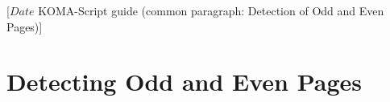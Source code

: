 %
%
%
%
%
%
%
%
% 
%
%
%
%

                 [$Date$
                  KOMA-Script guide (common paragraph: Detection of Odd and
                                     Even Pages)]


\section{Detecting Odd and Even Pages}
%
\BeginIndexGroup%
%
%

